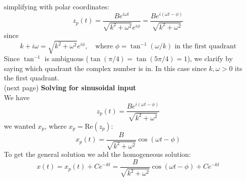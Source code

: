 \documentclass{report}
\begin{document}
simplifying with polar coordinates:
\begin{equation*}
z_p(t)=\frac{Be^{i\omega t}}{\sqrt{k^2+\omega^2}e^{i\phi}}
=\frac{Be^{i(\omega t-\phi)}}{\sqrt{k^2+\omega^2}}
\end{equation*}
since
\begin{equation*}
k+i\omega=\sqrt{k^2+\omega^2}e^{i\phi},\quad\text{where }\phi=\tan^{-1}(\omega/k)\text{ in the first quadrant}
\end{equation*}
Since $\tan^{-1}$ is ambiguous ($\tan(\pi/4)=\tan(5\pi/4)=1$), we clarify by saying which quadrant the
complex number is in. In this case since $k,\omega>0$ its the first quadrant.\\
(next page)
\newpage
\noindent\textbf{Solving for sinusoidal input}\\
We have 
\begin{equation*}
z_p(t)=\frac{Be^{i(\omega t-\phi)}}{\sqrt{k^2+\omega^2}}
\end{equation*}
we wanted $x_p$, where $x_p=\text{Re}(z_p)$:
\begin{equation*}
x_p(t)=\frac{B}{\sqrt{k^2+\omega^2}}\cos(\omega t-\phi)
\end{equation*}
To get the general solution we add the homogeneous solution:
\begin{equation*}
x(t)=x_p(t)+Ce^{-kt}=\frac{B}{\sqrt{k^2+\omega^2}}\cos(\omega t-\phi)+Ce^{-kt}
\end{equation*}
\newpage
\end{document}

